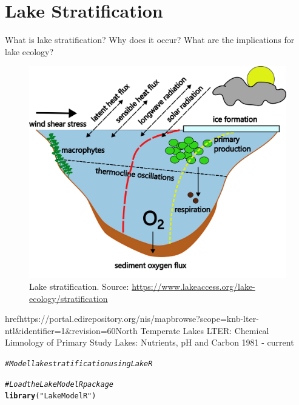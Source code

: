 \documentclass{tufte-handout}\usepackage[]{graphicx}\usepackage[]{xcolor}
\title{}
\makeatletter
\newcommand{\hlstr}[1]{\textcolor[rgb]{0.192,0.494,0.8}{#1}}%
\newcommand{\hlcom}[1]{\textcolor[rgb]{0.678,0.584,0.686}{\textit{#1}}}%
\newcommand{\hlstd}[1]{\textcolor[rgb]{0.345,0.345,0.345}{#1}}%
\newcommand{\hlkwd}[1]{\textcolor[rgb]{0.737,0.353,0.396}{\textbf{#1}}}%
\newenvironment{kframe}{%
 \def\at@end@of@kframe{}%
 \ifinner\ifhmode%
  \def\at@end@of@kframe{\end{minipage}}%
  \begin{minipage}{\columnwidth}%
 \fi\fi%
 \def\FrameCommand##1{\hskip\@totalleftmargin \hskip-\fboxsep
 \colorbox{shadecolor}{##1}\hskip-\fboxsep
     \hskip-\linewidth \hskip-\@totalleftmargin \hskip\columnwidth}%
 \MakeFramed {\advance\hsize-\width
   \@totalleftmargin\z@ \linewidth\hsize
   \@setminipage}}%
 {\par\unskip\endMakeFramed%
 \at@end@of@kframe}
\newenvironment{knitrout}{}{} %
\makeatother
\begin{document}
\maketitle

\section{Lake Stratification}

What is lake stratification?  Why does it occur?  What are the implications for lake ecology?

\begin{figure}
  \includegraphics{graphics/LakeModelR_conceptart.png}
  \caption{Lake stratification.  Source: \url{https://www.lakeaccess.org/lake-ecology/stratification}}
\end{figure}


href{https://portal.edirepository.org/nis/mapbrowse?scope=knb-lter-ntl&identifier=1&revision=60}{North Temperate Lakes LTER: Chemical Limnology of Primary Study Lakes: Nutrients, pH and Carbon 1981 - current}


\begin{knitrout}
\color{fgcolor}\begin{kframe}
\begin{alltt}
\hlcom{# Model lake stratification using LakeR}

\hlcom{# Load the LakeModelR package}
\hlkwd{library}\hlstd{(}\hlstr{"LakeModelR"}\hlstd{)}
\end{alltt}
\end{kframe}
\end{knitrout}
\end{document}
